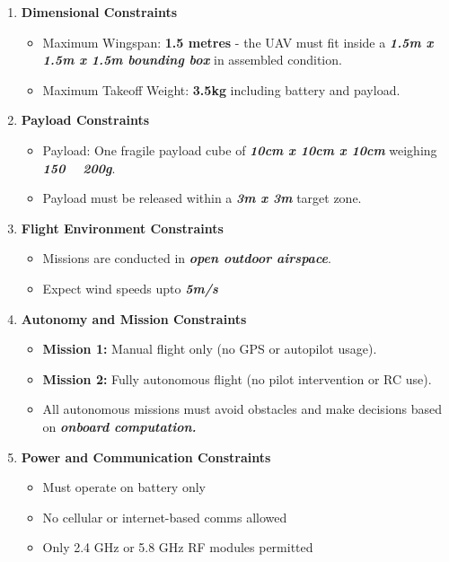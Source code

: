 \documentclass[12pt]{report}
\begin{document}
    \begin{enumerate}
      \item \textbf{Dimensional Constraints}
        \begin{itemize}
          \item Maximum Wingspan: \textbf{1.5 metres} - the UAV must fit inside a \textbf{\textit{1.5m x 1.5m x 1.5m bounding box}} in assembled condition.
          \item Maximum Takeoff Weight: \textbf{3.5kg} including battery and payload.
        \end{itemize}
      \item \textbf{Payload Constraints}
        \begin{itemize}
          \item Payload: One fragile payload cube of \textbf{\textit{10cm x 10cm x 10cm}} weighing \textbf{\textit{150 ~ 200g}}.
          \item Payload must be released within a \textbf{\textit{3m x 3m}} target zone.
        \end{itemize}
      \item \textbf{Flight Environment Constraints}
        \begin{itemize}
          \item Missions are conducted in \textbf{\textit{open outdoor airspace}}.
          \item Expect wind speeds upto \textbf{\textit{5m/s}}
        \end{itemize}
      \item \textbf{Autonomy and Mission Constraints}
        \begin{itemize}
          \item \textbf{Mission 1:} Manual flight only (no GPS or autopilot usage).
          \item \textbf{Mission 2:} Fully autonomous flight (no pilot intervention or RC use).
          \item All autonomous missions must avoid obstacles and make decisions based on \textbf{\textit{onboard computation.}}
        \end{itemize}
      \item \textbf{Power and Communication Constraints}
        \begin{itemize}
          \item Must operate on battery only
          \item No cellular or internet-based comms allowed
          \item Only 2.4 GHz or 5.8 GHz RF modules permitted

\end{itemize}
\end{enumerate}
\end{document}
